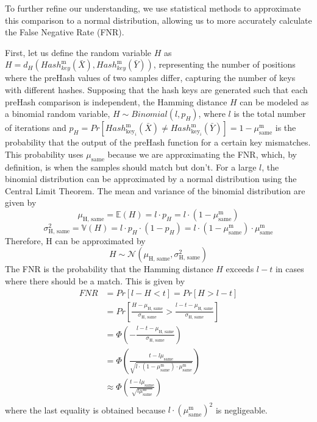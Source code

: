 To further refine our understanding, we use statistical methods to approximate this comparison to a normal distribution, allowing us to more accurately calculate the False Negative Rate (FNR). 

First, let us define the random variable $H$ as \(H = d_H(Hash_{key}^\text{m}(\bar{X}), Hash_{key}^\text{m}(\bar{Y}))\), representing the number of positions where the preHash values of two samples differ, capturing the number of keys with different hashes. Supposing that the hash keys are generated such that each preHash comparison is independent, the Hamming distance $H$ can be modeled as a binomial random variable, \(H \sim Binomial(l, p_H)\), where $l$ is the total number of iterations and $p_H = Pr[Hash_{\text{key}_i}^\text{m}(\bar{X}) \neq Hash_{\text{key}_i}^\text{m}(\bar{Y})] = 1 - \mu_{\text{same}}^\text{m}$ is the probability that the output of the preHash function for a certain key mismatches. This probability uses $\mu_{\text{same}}$ because we are approximating the FNR, which, by definition, is when the samples should match but don't. 
\newline For a large $l$, the binomial distribution can be approximated by a normal distribution using the Central Limit Theorem. The mean and variance of the binomial distribution are given by
\[
\mu_{\text{H, same}} = \mathbb{E}(H) = l \cdot p_H = l \cdot (1 - \mu_{\text{same}}^\text{m})    
\]
\[
\sigma_{\text{H, same}}^2 = \mathbb{V}(H) = l \cdot p_H \cdot (1 - p_H) = l \cdot (1 - \mu_{\text{same}}^\text{m}) \cdot \mu_{\text{same}}^\text{m}    
\]
Therefore, H can be approximated by
\[
H \sim \mathcal{N}(\mu_{\text{H, same}}, \sigma_{\text{H, same}}^\text{2})    
\]
The FNR is the probability that the Hamming distance $H$ exceeds $l - t$ in cases where there should be a match. This is given by
\begin{equation}
    \begin{aligned}
        \label{eq:fnr}
        FNR &= Pr[l - H < t] = Pr[H > l - t] \\
        &= Pr\left[\frac{H - \mu_{\text{H, same}}}{\sigma_{\text{H, same}}} > \frac{l - t - \mu_{\text{H, same}}}{\sigma_{\text{H, same}}}\right] \\
        &= \Phi \left( - \frac{l - t - \mu_{\text{H, same}}}{\sigma_{\text{H, same}}}\right) \\
        &= \Phi \left(\frac{t - l\mu_{\text{same}}}{\sqrt{l \cdot (1 - \mu_{\text{same}}^\text{m}) \cdot \mu_{\text{same}}^\text{m}}}\right) \\
        &\approx \Phi \left(\frac{t - l\mu_{\text{same}}}{\sqrt{l\mu_{\text{same}}^\text{m}}}\right) \\
    \end{aligned}        
\end{equation}
where the last equality is obtained because $l\cdot(\mu_{\text{same}}^\text{m})^2$ is negligeable. 

